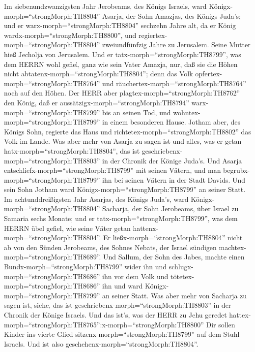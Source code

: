  Im siebenundzwanzigsten Jahr Jerobeams, des Königs Israels,
ward Königx-morph=``strongMorph:TH8804'' Asarja, der Sohn Amazjas, des
Königs Juda's;  und er warx-morph=``strongMorph:TH8804''
sechzehn Jahre alt, da er König wardx-morph=``strongMorph:TH8800'', und
regiertex-morph=``strongMorph:TH8804'' zweiundfünfzig Jahre zu
Jerusalem. Seine Mutter hieß Jecholja von Jerusalem.  Und er
tatx-morph=``strongMorph:TH8799'', was dem HERRN wohl gefiel, ganz wie
sein Vater Amazja,  nur, daß sie die Höhen nicht
abtatenx-morph=``strongMorph:TH8804''; denn das Volk
opfertex-morph=``strongMorph:TH8764'' und
räuchertex-morph=``strongMorph:TH8764'' noch auf den Höhen. 
Der HERR aber plagtex-morph=``strongMorph:TH8762'' den König, daß er
aussätzigx-morph=``strongMorph:TH8794''
warx-morph=``strongMorph:TH8799'' bis an seinen Tod, und
wohntex-morph=``strongMorph:TH8799'' in einem besonderen Hause. Jotham
aber, des Königs Sohn, regierte das Haus und
richtetex-morph=``strongMorph:TH8802'' das Volk im Lande. 
Was aber mehr von Asarja zu sagen ist und alles, was er getan
hatx-morph=``strongMorph:TH8804'', das ist
geschriebenx-morph=``strongMorph:TH8803'' in der Chronik der Könige
Juda's.  Und Asarja entschliefx-morph=``strongMorph:TH8799''
mit seinen Vätern, und man begrubx-morph=``strongMorph:TH8799'' ihn bei
seinen Vätern in der Stadt Davids. Und sein Sohn Jotham ward
Königx-morph=``strongMorph:TH8799'' an seiner Statt.  Im
achtunddreißigsten Jahr Asarjas, des Königs Juda's, ward
Königx-morph=``strongMorph:TH8804'' Sacharja, der Sohn Jerobeams, über
Israel zu Samaria sechs Monate;  und er
tatx-morph=``strongMorph:TH8799'', was dem HERRN übel gefiel, wie seine
Väter getan hattenx-morph=``strongMorph:TH8804''. Er
ließx-morph=``strongMorph:TH8804'' nicht ab von den Sünden Jerobeams,
des Sohnes Nebats, der Israel sündigen
machtex-morph=``strongMorph:TH8689''.  Und Sallum, der Sohn
des Jabes, machte einen Bundx-morph=``strongMorph:TH8799'' wider ihn und
schlugx-morph=``strongMorph:TH8686'' ihn vor dem Volk und
tötetex-morph=``strongMorph:TH8686'' ihn und ward
Königx-morph=``strongMorph:TH8799'' an seiner Statt.  Was
aber mehr von Sacharja zu sagen ist, siehe, das ist
geschriebenx-morph=``strongMorph:TH8803'' in der Chronik der Könige
Israels.  Und das ist's, was der HERR zu Jehu geredet
hattex-morph=``strongMorph:TH8765'':x-morph=``strongMorph:TH8800'' Dir
sollen Kinder ins vierte Glied sitzenx-morph=``strongMorph:TH8799'' auf
dem Stuhl Israels. Und ist also geschehenx-morph=``strongMorph:TH8804''.
